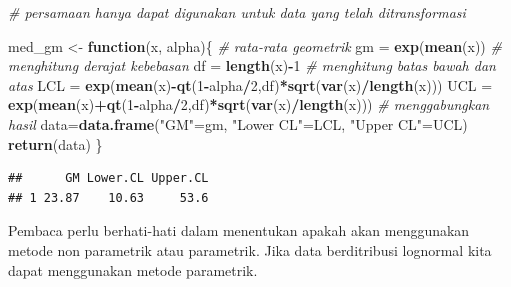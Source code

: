 \documentclass[]{book}
\newenvironment{Shaded}{\begin{snugshade}}{\end{snugshade}}
\newcommand{\KeywordTok}[1]{\textcolor[rgb]{0.13,0.29,0.53}{\textbf{#1}}}
\newcommand{\DataTypeTok}[1]{\textcolor[rgb]{0.13,0.29,0.53}{#1}}
\newcommand{\DecValTok}[1]{\textcolor[rgb]{0.00,0.00,0.81}{#1}}
\newcommand{\FloatTok}[1]{\textcolor[rgb]{0.00,0.00,0.81}{#1}}
\newcommand{\StringTok}[1]{\textcolor[rgb]{0.31,0.60,0.02}{#1}}
\newcommand{\CommentTok}[1]{\textcolor[rgb]{0.56,0.35,0.01}{\textit{#1}}}
\newcommand{\ControlFlowTok}[1]{\textcolor[rgb]{0.13,0.29,0.53}{\textbf{#1}}}
\newcommand{\OperatorTok}[1]{\textcolor[rgb]{0.81,0.36,0.00}{\textbf{#1}}}
\newcommand{\NormalTok}[1]{#1}
\begin{document}
\begin{Shaded}
\begin{Highlighting}[]
\CommentTok{# persamaan hanya dapat digunakan untuk data yang telah ditransformasi}

\NormalTok{med_gm <-}\StringTok{ }\ControlFlowTok{function}\NormalTok{(x, alpha)\{}
  \CommentTok{# rata-rata geometrik}
\NormalTok{  gm =}\StringTok{ }\KeywordTok{exp}\NormalTok{(}\KeywordTok{mean}\NormalTok{(x))}
  \CommentTok{# menghitung derajat kebebasan}
\NormalTok{  df =}\StringTok{ }\KeywordTok{length}\NormalTok{(x)}\OperatorTok{-}\DecValTok{1}
  \CommentTok{# menghitung batas bawah dan atas}
\NormalTok{  LCL =}\StringTok{ }\KeywordTok{exp}\NormalTok{(}\KeywordTok{mean}\NormalTok{(x)}\OperatorTok{-}\KeywordTok{qt}\NormalTok{(}\DecValTok{1}\OperatorTok{-}\NormalTok{alpha}\OperatorTok{/}\DecValTok{2}\NormalTok{,df)}\OperatorTok{*}\KeywordTok{sqrt}\NormalTok{(}\KeywordTok{var}\NormalTok{(x)}\OperatorTok{/}\KeywordTok{length}\NormalTok{(x)))}
\NormalTok{  UCL =}\StringTok{ }\KeywordTok{exp}\NormalTok{(}\KeywordTok{mean}\NormalTok{(x)}\OperatorTok{+}\KeywordTok{qt}\NormalTok{(}\DecValTok{1}\OperatorTok{-}\NormalTok{alpha}\OperatorTok{/}\DecValTok{2}\NormalTok{,df)}\OperatorTok{*}\KeywordTok{sqrt}\NormalTok{(}\KeywordTok{var}\NormalTok{(x)}\OperatorTok{/}\KeywordTok{length}\NormalTok{(x)))}
  \CommentTok{# menggabungkan hasil}
\NormalTok{  data=}\KeywordTok{data.frame}\NormalTok{(}\StringTok{"GM"}\NormalTok{=gm,}
                  \StringTok{"Lower CL"}\NormalTok{=LCL,}
                  \StringTok{"Upper CL"}\NormalTok{=UCL)}
  \KeywordTok{return}\NormalTok{(data)}
\NormalTok{\}}
\end{Highlighting}
\end{Shaded}

\begin{Shaded}
\end{Shaded}

\begin{verbatim}
##      GM Lower.CL Upper.CL
## 1 23.87    10.63     53.6
\end{verbatim}

Pembaca perlu berhati-hati dalam menentukan apakah akan menggunakan
metode non parametrik atau parametrik. Jika data berditribusi lognormal
kita dapat menggunakan metode parametrik.


\end{document}
